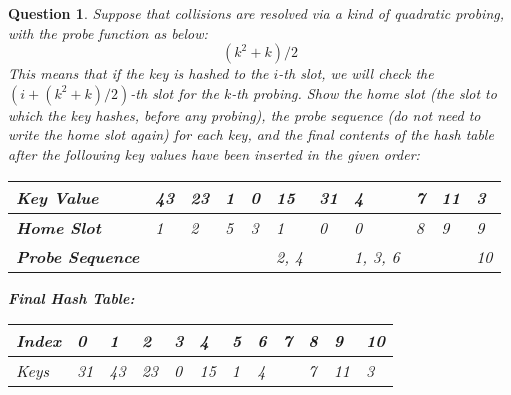 \documentclass[10.5pt]{article}
\newtheorem{Q}{Question}
\begin{document}
\begin{Q}
Suppose that collisions are resolved via a kind of quadratic probing, with the probe function as below:
$$(k^2+k)/2$$
This means that if the key is hashed to the $i$-th slot, we will check the $(i+(k^2+k)/2)$-th slot for the $k$-th probing. Show the home slot (the slot to which the key hashes, before any probing), the probe sequence (do not need to write the home slot again) for each key, and the final contents of the hash table after the following key values have been inserted in the given order: 
\begin{table}[ht]
\begin{tabular}{|p{1.7cm}|p{1cm}|p{1cm}|p{1cm}|p{1cm}|p{1cm}|p{1cm}|p{1cm}|p{1cm}|p{1cm}|p{1cm}|}
\hline
\textbf{Key Value}     &43&23&1&0&15  &31&4      &7&11&3 \\ \hline
\textbf{Home Slot}     &1 &2 &5&3&1   &0 &0      &8&9 &9     \\ \hline
\textbf{Probe Sequence}&  &  & & &2, 4&  &1, 3, 6& &  &10     \\ \hline
\end{tabular}
\end{table}

\textbf{Final Hash Table:}
\begin{table}[ht]
\begin{tabular}{|l|p{1cm}|p{1cm}|p{1cm}|p{1cm}|p{1cm}|p{1cm}|p{1cm}|p{1cm}|p{1cm}|p{1cm}|p{1cm}|}
\hline
Index &0& 1 &2 &3&4 &5&6&7&8&9&10 \\ \hline
Keys  &31&43&23&0&15&1&4& &7&11&3     \\ \hline
\end{tabular}
\end{table}
\end{Q}
\end{document}
